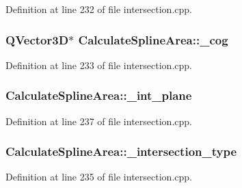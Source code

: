 Definition at line 232 of file intersection.\+cpp.

\subsubsection[{\texorpdfstring{\+\_\+cog}{_cog}}]{\setlength{\rightskip}{0pt plus 5cm}Q\+Vector3D$\ast$ Calculate\+Spline\+Area\+::\+\_\+cog}\hypertarget{structCalculateSplineArea_abe01c8bb84cfb1900fa06e9e16fcc575}{}\label{structCalculateSplineArea_abe01c8bb84cfb1900fa06e9e16fcc575}


Definition at line 233 of file intersection.\+cpp.

\subsubsection[{\texorpdfstring{\+\_\+int\+\_\+plane}{_int_plane}}]{ Calculate\+Spline\+Area\+::\+\_\+int\+\_\+plane}\hypertarget{structCalculateSplineArea_a4d0feb7db0aca705a54f2f612290e970}{}\label{structCalculateSplineArea_a4d0feb7db0aca705a54f2f612290e970}


Definition at line 237 of file intersection.\+cpp.

\subsubsection[{\texorpdfstring{\+\_\+intersection\+\_\+type}{_intersection_type}}]{ Calculate\+Spline\+Area\+::\+\_\+intersection\+\_\+type}\hypertarget{structCalculateSplineArea_aae716b66f114f0217e68efc79ca9cc91}{}\label{structCalculateSplineArea_aae716b66f114f0217e68efc79ca9cc91}


Definition at line 235 of file intersection.\+cpp.

